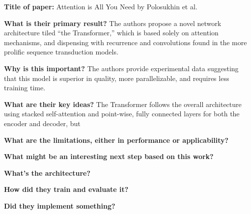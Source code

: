 \noindent \textbf{\large Title of paper: } Attention is All You Need by
Polosukhin et al.

\noindent\textbf{\large What is their primary result?} The authors propose a
novel network architecture tiled ``the Transformer,'' which is based solely on
attention mechanisms, and dispensing with recurrence and convolutions found in
the more prolific sequence transduction models.

\noindent\textbf{\large Why is this important?} The authors provide experimental
data suggesting that this model is superior in quality, more parallelizable, and
requires less training time.

\noindent\textbf{\large What are their key ideas?} The Transformer follows the
overall architecture using stacked self-attention and point-wise, fully
connected layers for both the encoder and decoder, but

\noindent\textbf{\large What are the limitations, either in performance or
  applicability?}

\noindent\textbf{\large What might be an interesting next step based on this
  work?}

\noindent\textbf{\large What's the architecture?}

\noindent\textbf{\large How did they train and evaluate it?}

\noindent\textbf{\large Did they implement something?}


